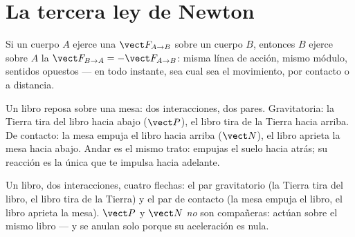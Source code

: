 \section{La tercera ley de Newton}

\begin{theorem}\label{thm:g12:newtons-laws:third}
Si un cuerpo $A$ ejerce una  $\vect F_{A \to B}$ sobre un cuerpo $B$, entonces
$B$ ejerce sobre $A$ la  $\vect F_{B \to A} = -\vect F_{A \to B}$: misma línea de
acción, mismo módulo, sentidos opuestos --- en todo instante, sea cual sea el
movimiento, por contacto o a distancia.
\end{theorem}
\admitted

\begin{example}\label{ex:g12:newtons-laws:book}
Un libro reposa sobre una mesa: dos interacciones, dos pares. Gravitatoria: la Tierra
tira del libro hacia abajo ($\vect P$), el libro tira de la Tierra hacia arriba. De
contacto: la mesa empuja el libro hacia arriba ($\vect N$), el libro aprieta la mesa
hacia abajo. Andar es el mismo trato: empujas el suelo hacia atrás; su reacción es la
única  que te impulsa hacia adelante.
\end{example}

\begin{omfigure}

{\small Un libro, dos interacciones, cuatro flechas: el par gravitatorio (la Tierra
tira del libro, el libro tira de la Tierra) y el par de contacto (la mesa empuja el
libro, el libro aprieta la mesa). $\vect P$ y $\vect N$ \emph{no} son compañeras:
actúan sobre el mismo libro --- y se anulan solo porque su aceleración es nula.}
\end{omfigure}

